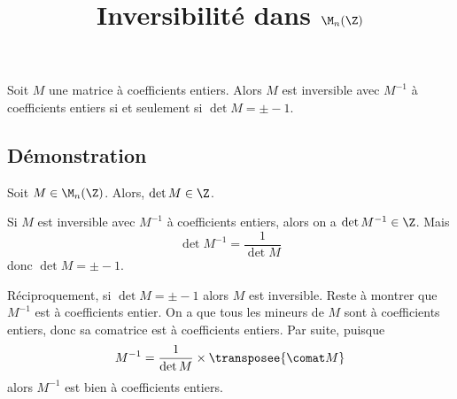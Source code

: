 \documentclass[fontsize=12pt,twoside=false,parskip=half]{scrartcl}
\title{Inversibilité dans $\M_n(\Z)$}
\date{}
\author{}
\begin{document}
\maketitle
   \begin{Theoreme}
      Soit $M$ une matrice à coefficients entiers. Alors $M$ est inversible 
      avec $M^{-1}$ à coefficients entiers si et seulement si $\det M = \pm -1$.
   \end{Theoreme}
   \subsection{Démonstration}
       Soit $M \in \M_n(\Z)$. Alors, $\det M \in \Z$.
       
       Si $M$ est inversible avec $M^{-1}$ à coefficients entiers, alors on a
       $\det M^{-1} \in \Z$. Mais
       \[
           \det M^{-1} = \frac{1}{\det M}
       \]
       donc $\det M = \pm -1$.
       
       Réciproquement, si $\det M = \pm -1$ alors $M$ est inversible. Reste à 
       montrer que $M^{-1}$ est à coefficients entier. On a que tous les mineurs
       de $M$ sont à coefficients entiers, donc sa comatrice est à coefficients
       entiers. Par suite, puisque
       \[
           M^{-1} = \frac{1}{\det M} \times \transposee{\comat M}
       \]
       alors $M^{-1}$ est bien à coefficients entiers.
\end{document}
